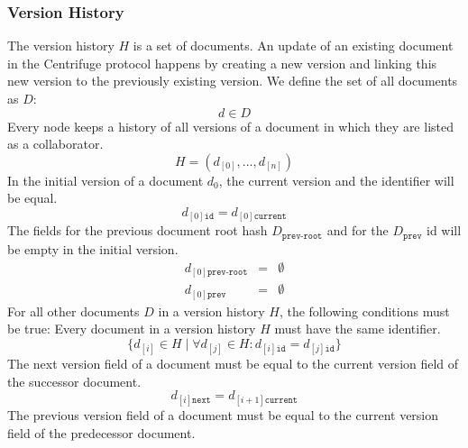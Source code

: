 \subsubsection{Version History}\label{sec:version_history}
The version history $H$ is a set of documents. An update of an existing document in the Centrifuge protocol happens by creating a new version and linking this new version to the previously existing version. 
We define the set of all documents as $D$:
\begin{equation}
d \in D
\end{equation}
Every node keeps a history of all versions of a document in which they are listed as a collaborator.
\begin{equation}
H = (d_{[0]},...,d_{[n]})
\end{equation}
\newline
In the initial version of a document $d_0$, the current version and the identifier will be equal.
\begin{equation}
d_{[0]{\texttt{id}}} = d_{[0]\texttt{current}}
\end{equation}
\newline
The fields for the previous document root hash $D_{\texttt{prev-root}}$ and for the $D_{\texttt{prev}}$ id will be empty in the initial version.
\begin{eqnarray}
d_{[0]{\texttt{prev-root}}}& = & \emptyset \\
d_{[0]{\texttt{prev}}} & = & \emptyset
\end{eqnarray}
\newline
For all other documents $D$ in a version history $H$, the following conditions must be true:
\newline
\newline
Every document in a version history $H$ must have the same identifier.
\begin{equation}
\{d_{[i]} \in H \mid \forall d_{[j]} \in H :d_{[i]\texttt{id}} = d_{[j]\texttt{id}} \}
\end{equation}
\newline
The next version field of a document must be equal to the current version field of the successor document.
\begin{equation}
d_{[i]\texttt{next}} = d_{[i+1]\texttt{current}} 
\end{equation}
\newline
The previous version field of a document must be equal to the current version field of the predecessor document.

